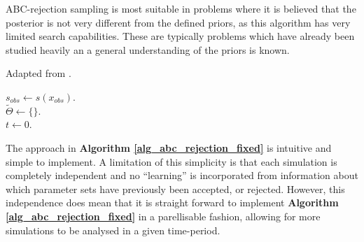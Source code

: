 \documentclass[11pt,a4paper]{article}
\theoremstyle{break}
\begin{document}
  \par ABC-rejection sampling is most suitable in problems where it is believed that the posterior is not very different from the defined priors, as this algorithm has very limited search capabilities. These are typically problems which have already been studied heavily an a general understanding of the priors is known.

  \begin{box_algorithm}\label{alg_abc_rejection_fixed}
    Adapted from \cite[]{ABC_in_population_genetics}.
    \begin{algorithm}[H]
      $s_{obs}\leftarrow s(x_{obs})$.\\
      $\tilde\Theta\leftarrow\{\}$.\\
      $t\leftarrow0$.\\
    \end{algorithm}
  \end{box_algorithm}

  \par The approach in \textbf{Algorithm \ref{alg_abc_rejection_fixed}} is intuitive and simple to implement. A limitation of this simplicity is that each simulation is completely independent and no ``learning'' is incorporated from information about which parameter sets have previously been accepted, or rejected. However, this independence does mean that it is straight forward to implement \textbf{Algorithm \ref{alg_abc_rejection_fixed}} in a parellisable fashion, allowing for more simulations to be analysed in a given time-period.
\end{document}
